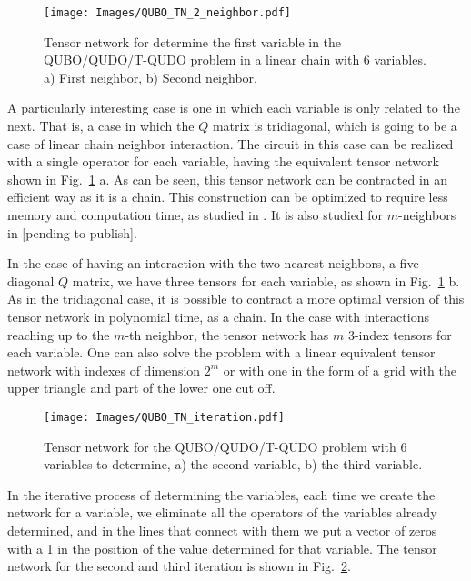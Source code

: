 \begin{figure}
    \centering
    \texttt{[image: Images/QUBO\_TN\_2\_neighbor.pdf]}
    \caption{Tensor network for determine the first variable in the QUBO/QUDO/T-QUDO problem in a linear chain with 6 variables. a) First neighbor, b) Second neighbor.}
    \label{fig: QUBO Tridiag}
\end{figure}

A particularly interesting case is one in which each variable is only related to the next. That is, a case in which the $Q$ matrix is tridiagonal, which is going to be a case of linear chain neighbor interaction. The circuit in this case can be realized with a single operator for each variable, having the equivalent tensor network shown in Fig.~\ref{fig: QUBO Tridiag} a. As can be seen, this tensor network can be contracted in an efficient way as it is a chain. This construction can be optimized to require less memory and computation time, as studied in \cite{QUBO_Tridiagonal}.  It is also studied for $m$-neighbors in {\color{red} [pending to publish]}.

In the case of having an interaction with the two nearest neighbors, a five-diagonal $Q$ matrix, we have three tensors for each variable, as shown in Fig.~\ref{fig: QUBO Tridiag} b. As in the tridiagonal case, it is possible to contract a more optimal version of this tensor network in polynomial time, as a chain. In the case with interactions reaching up to the $m$-th neighbor, the tensor network has $m$ 3-index tensors for each variable. One can also solve the problem with a linear equivalent tensor network with indexes of dimension $2^m$ or with one in the form of a grid with the upper triangle and part of the lower one cut off.

\begin{figure}
    \centering
    \texttt{[image: Images/QUBO\_TN\_iteration.pdf]}
    \caption{Tensor network for the QUBO/QUDO/T-QUDO problem with 6 variables to determine, a) the second variable, b) the third variable.}
    \label{fig: QUBO Iteration}
\end{figure}

In the iterative process of determining the variables, each time we create the network for a variable, we eliminate all the operators of the variables already determined, and in the lines that connect with them we put a vector of zeros with a 1 in the position of the value determined for that variable. The tensor network for the second and third iteration is shown in Fig.~\ref{fig: QUBO Iteration}.

